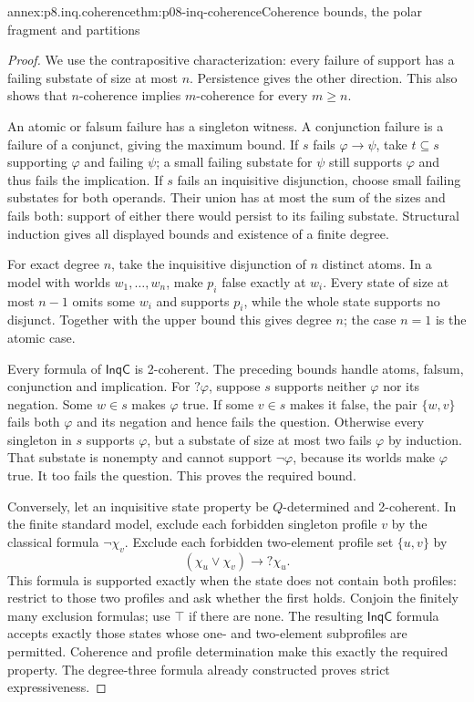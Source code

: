\begin{annexitem}{annex:p8.inq.coherence}{thm:p08-inq-coherence}{Coherence bounds, the polar fragment and partitions}
\begin{proof}
We use the contrapositive characterization: every failure of support has
a failing substate of size at most \(n\). Persistence gives the other
direction. This also shows that \(n\)-coherence implies \(m\)-coherence
for every \(m\geq n\).

An atomic or falsum failure has a singleton witness. A conjunction
failure is a failure of a conjunct, giving the maximum bound. If
\(s\) fails \(\varphi\to\psi\), take \(t\subseteq s\) supporting
\(\varphi\) and failing \(\psi\); a small failing substate for
\(\psi\) still supports \(\varphi\) and thus fails the implication.
If \(s\) fails an inquisitive disjunction, choose small failing substates
for both operands. Their union has at most the sum of the sizes and
fails both: support of either there would persist to its failing
substate. Structural induction gives all displayed bounds and existence
of a finite degree.

For exact degree \(n\), take the inquisitive disjunction of \(n\)
distinct atoms. In a model with worlds \(w_1,\ldots,w_n\), make
\(p_i\) false exactly at \(w_i\). Every state of size at most \(n-1\)
omits some \(w_i\) and supports \(p_i\), while the whole state
supports no disjunct. Together with the upper bound this gives degree
\(n\); the case \(n=1\) is the atomic case.

Every formula of \(\mathsf{InqC}\) is 2-coherent. The preceding bounds
handle atoms, falsum, conjunction and implication. For \(?\varphi\),
suppose \(s\) supports neither \(\varphi\) nor its negation.
Some \(w\in s\) makes \(\varphi\) true. If some \(v\in s\) makes
it false, the pair \(\{w,v\}\) fails both \(\varphi\) and its
negation and hence fails the question. Otherwise every singleton in
\(s\) supports \(\varphi\), but a substate of size at most two fails
\(\varphi\) by induction. That substate is nonempty and cannot support
\(\neg\varphi\), because its worlds make \(\varphi\) true.
It too fails the question. This proves the required bound.

Conversely, let an inquisitive state property be \(Q\)-determined and
2-coherent. In the finite standard model, exclude each forbidden singleton
profile \(v\) by the classical formula \(\neg\chi_v\). Exclude each
forbidden two-element profile set \(\{u,v\}\) by
\[
 (\chi_u\lor\chi_v)\to?\chi_u.
\]
This formula is supported exactly when the state does not contain both
profiles: restrict to those two profiles and ask whether the first holds.
Conjoin the finitely many exclusion formulas; use \(\top\) if there
are none. The resulting \(\mathsf{InqC}\) formula accepts exactly those
states whose one- and two-element subprofiles are permitted. Coherence
and profile determination make this exactly the required property.
The degree-three formula already constructed proves strict expressiveness.


\end{proof}
\end{annexitem}
